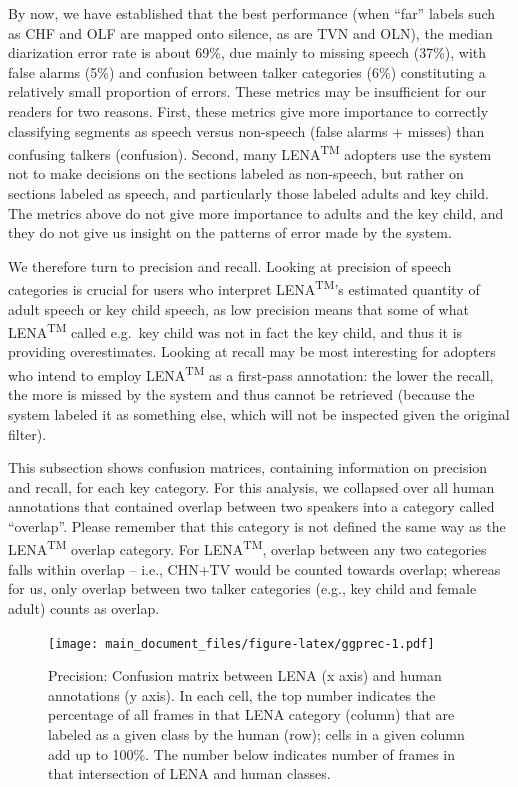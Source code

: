 \documentclass[english,table,man,floatsintext]{apa6}
\begin{document}
By now, we have established that the best performance (when \enquote{far} labels such as CHF and OLF are mapped onto silence, as are TVN and OLN), the median diarization error rate is about 69\%, due mainly to missing speech (37\%), with false alarms (5\%) and confusion between talker categories (6\%) constituting a relatively small proportion of errors. These metrics may be insufficient for our readers for two reasons. First, these metrics give more importance to correctly classifying segments as speech versus non-speech (false alarms + misses) than confusing talkers (confusion). Second, many LENA\textsuperscript{TM} adopters use the system not to make decisions on the sections labeled as non-speech, but rather on sections labeled as speech, and particularly those labeled adults and key child. The metrics above do not give more importance to adults and the key child, and they do not give us insight on the patterns of error made by the system.

We therefore turn to precision and recall. Looking at precision of speech categories is crucial for users who interpret LENA\textsuperscript{TM}'s estimated quantity of adult speech or key child speech, as low precision means that some of what LENA\textsuperscript{TM} called e.g.~key child was not in fact the key child, and thus it is providing overestimates. Looking at recall may be most interesting for adopters who intend to employ LENA\textsuperscript{TM} as a first-pass annotation: the lower the recall, the more is missed by the system and thus cannot be retrieved (because the system labeled it as something else, which will not be inspected given the original filter).

This subsection shows confusion matrices, containing information on precision and recall, for each key category. For this analysis, we collapsed over all human annotations that contained overlap between two speakers into a category called \enquote{overlap}. Please remember that this category is not defined the same way as the LENA\textsuperscript{TM} overlap category. For LENA\textsuperscript{TM}, overlap between any two categories falls within overlap -- i.e., CHN+TV would be counted towards overlap; whereas for us, only overlap between two talker categories (e.g., key child and female adult) counts as overlap.

\begin{figure}
\centering
\texttt{[image: main\_document\_files/figure-latex/ggprec-1.pdf]}
\caption{\label{fig:ggprec}Precision: Confusion matrix between LENA (x axis) and human annotations (y axis). In each cell, the top number indicates the percentage of all frames in that LENA category (column) that are labeled as a given class by the human (row); cells in a given column add up to 100\%. The number below indicates number of frames in that intersection of LENA and human classes.}
\end{figure}
\end{document}

